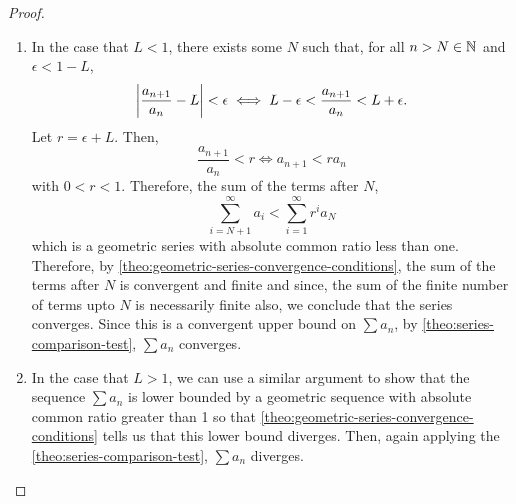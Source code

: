 \documentclass[../MathsNotesBase.tex]{subfiles}
\begin{document}
{	
		\bigskip
		\begin{proof}
			\nl
			\begin{enumerate}[label=(\roman*)]
				\item In the case that ${ L < 1 }$, there exists some $N$ such that, for all ${ n > N \in \mathbb{N}^{} }$ and ${ \epsilon < 1 - L }$,
				\[ \left\lvert\frac{a_{n+1}}{a_n} - L\right\rvert < \epsilon \iff L - \epsilon < \frac{a_{n+1}}{a_n} < L + \epsilon. \]
				Let ${ r = \epsilon + L }$. Then,
				\[ \frac{a_{n+1}}{a_n} < r \iff a_{n+1} < r a_n \]
				with ${ 0 < r < 1 }$. Therefore, the sum of the terms after $N$,
				\[ \sum_{i=N+1}^\infty a_i <  \sum_{i=1}^\infty r^i a_N \]
				which is a geometric series with absolute common ratio less than one. Therefore, by \autoref{theo:geometric-series-convergence-conditions}, the sum of the terms after $N$ is convergent and finite and since, the sum of the finite number of terms upto $N$ is necessarily finite also, we conclude that the series converges. Since this is a convergent upper bound on ${ \sum a_n }$, by \autoref{theo:series-comparison-test}, ${ \sum a_n }$ converges.
				\medskip
				\item In the case that ${ L > 1 }$, we can use a similar argument to show that the sequence ${ \sum a_n }$ is lower bounded by a geometric sequence with absolute common ratio greater than 1 so that \autoref{theo:geometric-series-convergence-conditions} tells us that this lower bound diverges. Then, again applying the \autoref{theo:series-comparison-test}, ${ \sum a_n }$ diverges.
			\end{enumerate}
		\end{proof}
		
}
\end{document}
